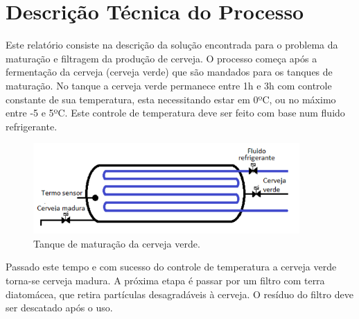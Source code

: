 \documentclass[12pt]{article}
\begin{document}


\tableofcontents
 
\clearpage

\section{Descrição Técnica do Processo}

\begin{par}
Este relatório consiste na descrição da solução encontrada para o problema da maturação e filtragem da produção de cerveja. O processo começa após a fermentação da cerveja (cerveja verde) que são mandados para os tanques de maturação. No tanque a cerveja verde permanece entre 1h e 3h com controle constante de sua temperatura, esta necessitando estar em 0ºC, ou no máximo entre -5 e 5ºC. Este controle de temperatura deve ser feito com base num fluido refrigerante.
\end{par}

\begin{figure}[H]
\centering
\includegraphics [width=4in]{tanque.png}
\caption {Tanque de maturação da cerveja verde.}
\label{fig:corrente}
\end{figure}

\begin{par}
Passado este tempo e com sucesso do controle de temperatura a cerveja verde torna-se cerveja madura. A próxima etapa é passar por um filtro com terra diatomácea, que retira partículas desagradáveis à cerveja. O resíduo do filtro deve ser descatado após o uso.
\end{par}
\end{document}
